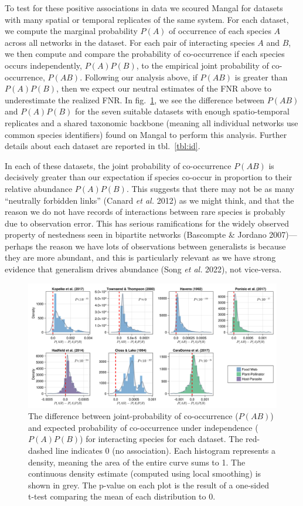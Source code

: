 \documentclass[11pt]{article}
\makeatletter
\def\maxwidth{\ifdim\Gin@nat@width>\linewidth\linewidth
\else\Gin@nat@width\fi}
\let\Oldincludegraphics\includegraphics
\renewcommand{\includegraphics}[1]{\Oldincludegraphics[width=\maxwidth]{#1}}
\makeatother
\begin{document}
To test for these positive associations in data we scoured Mangal for
datasets with many spatial or temporal replicates of the same system.
For each dataset, we compute the marginal probability \(P(A)\) of
occurrence of each species \(A\) across all networks in the dataset. For
each pair of interacting species \(A\) and \(B\), we then compute and
compare the probability of co-occurrence if each species occurs
independently, \(P(A)P(B)\), to the empirical joint probability of
co-occurrence, \(P(AB)\). Following our analysis above, if \(P(AB)\) is
greater than \(P(A)P(B)\), then we expect our neutral estimates of the
FNR above to underestimate the realized FNR. In fig.~\ref{fig:mangal},
we see the difference between \(P(AB)\) and \(P(A)P(B)\) for the seven
suitable datasets with enough spatio-temporal replicates and a shared
taxonomic backbone (meaning all individual networks use common species
identifiers) found on Mangal to perform this analysis. Further details
about each dataset are reported in tbl.~\ref{tbl:id}.

In each of these datasets, the joint probability of co-occurrence
\(P(AB)\) is decisively greater than our expectation if species co-occur
in proportion to their relative abundance \(P(A)P(B)\). This suggests
that there may not be as many ``neutrally forbidden links'' (Canard
\emph{et al.} 2012) as we might think, and that the reason we do not
have records of interactions between rare species is probably due to
observation error. This has serious ramifications for the widely
observed property of nestedness seen in bipartite networks (Bascompte \&
Jordano 2007)---perhaps the reason we have lots of observations between
generalists is because they are more abundant, and this is particularly
relevant as we have strong evidence that generalism drives abundance
(Song \emph{et al.} 2022), not vice-versa.

\begin{figure}
\hypertarget{fig:mangal}{%
\centering
\includegraphics{./figures/fig2.png}
\caption{The difference between joint-probability of co-occurrence
(\(P(AB)\)) and expected probability of co-occurrence under independence
(\(P(A)P(B)\)) for interacting species for each dataset. The red-dashed
line indicates 0 (no association). Each histogram represents a density,
meaning the area of the entire curve sums to 1. The continuous density
estimate (computed using local smoothing) is shown in grey. The p-value
on each plot is the result of a one-sided t-test comparing the mean of
each distribution to 0.}\label{fig:mangal}
}
\end{figure}
\end{document}
